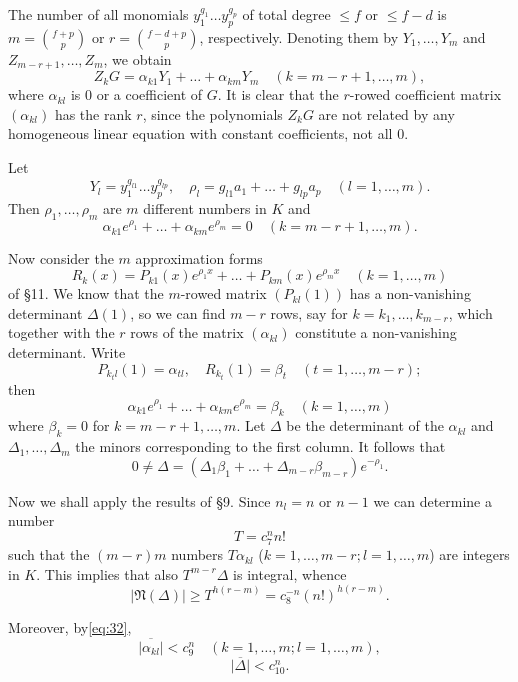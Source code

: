 The number of all monomials $y_1^{g_1} \dots y_p^{g_p}$ of total degree $\leq f$ or $\leq f-d$ is $m = \binom{f+p}{p}$ or $r = \binom{f-d+p}{p}$, respectively. Denoting them by $Y_1, \dots, Y_m$ and $Z_{m-r+1}, \dots, Z_m$, we obtain
\[ Z_k G = \alpha_{k1} Y_1 + \dots + \alpha_{km} Y_m \quad (k=m-r+1,\dots,m), \]
where $\alpha_{kl}$ is 0 or a coefficient of $G$. It is clear that the $r$-rowed coefficient matrix $(\alpha_{kl})$ has the rank $r$, since the polynomials $Z_k G$ are not related by any homogeneous linear equation with constant coefficients, not all 0.

Let
\[ Y_l = y_1^{g_{l1}} \dots y_p^{g_{lp}}, \quad \rho_l = g_{l1} a_1 + \dots + g_{lp} a_p \quad (l=1,\dots,m). \]
Then $\rho_1, \dots, \rho_m$ are $m$ different numbers in $K$ and
\[ \alpha_{k1} e^{\rho_1} + \dots + \alpha_{km} e^{\rho_m} = 0 \quad (k=m-r+1,\dots,m). \]

Now consider the $m$ approximation forms
\[ R_k(x) = P_{k1}(x) e^{\rho_1 x} + \dots + P_{km}(x) e^{\rho_m x} \quad (k=1,\dots,m) \]
of \S 11. We know that the $m$-rowed matrix $(P_{kl}(1))$ has a non-vanishing determinant $\Delta(1)$, so we can find $m-r$ rows, say for $k=k_1, \dots, k_{m-r}$, which together with the $r$ rows of the matrix $(\alpha_{kl})$ constitute a non-vanishing determinant. Write
\[ P_{k_t l}(1) = \alpha_{tl}, \quad R_{k_t}(1) = \beta_t \quad (t=1,\dots,m-r); \]
then
\[ \alpha_{k1} e^{\rho_1} + \dots + \alpha_{km} e^{\rho_m} = \beta_k \quad (k=1,\dots,m) \]
where $\beta_k = 0$ for $k=m-r+1, \dots, m$. Let $\Delta$ be the determinant of the $\alpha_{kl}$ and $\Delta_1, \dots, \Delta_m$ the minors corresponding to the first column. It follows that
\begin{equation} 0 \neq \Delta = (\Delta_1 \beta_1 + \dots + \Delta_{m-r} \beta_{m-r}) e^{-\rho_1}. \tag{38}\label{eq:38} \end{equation}

Now we shall apply the results of \S 9. Since $n_l = n$ or $n-1$ we can determine a number
\[ T = c_7^n n! \]
such that the $(m-r)m$ numbers $T\alpha_{kl}$ ($k=1,\dots,m-r; l=1,\dots,m$) are integers in $K$. This implies that also $T^{m-r}\Delta$ is integral, whence
\begin{equation} |\mathfrak{N}(\Delta)| \geq T^{h(r-m)} = c_8^{-n}(n!)^{h(r-m)}. \tag{39}\label{eq:39} \end{equation}

Moreover, by\eqref{eq:32},
\begin{equation} \overline{|\alpha_{kl}|} < c_9^n \quad (k=1,\dots,m; l=1,\dots,m), \tag{40}\label{eq:40} \end{equation}
\begin{equation} \overline{|\Delta|} < c_{10}^n. \tag{41}\label{eq:41} \end{equation}


